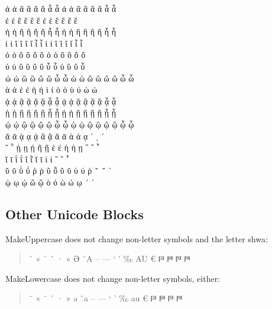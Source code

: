 \documentclass[a4paper]{scrartcl}
\begin{document}
\MakeLowercase{ ἀ ἁ ἂ ἃ ἄ ἅ ἆ ἇ Ἀ Ἁ Ἂ Ἃ Ἄ Ἅ Ἆ Ἇ }\\
\MakeLowercase{ ἐ ἑ ἒ ἓ ἔ ἕ     Ἐ Ἑ Ἒ Ἓ Ἔ Ἕ     }\\
\MakeLowercase{ ἠ ἡ ἢ ἣ ἤ ἥ ἦ ἧ Ἠ Ἡ Ἢ Ἣ Ἤ Ἥ Ἦ Ἧ }\\
\MakeLowercase{ ἰ ἱ ἲ ἳ ἴ ἵ ἶ ἷ Ἰ Ἱ Ἲ Ἳ Ἴ Ἵ Ἶ Ἷ }\\
\MakeLowercase{ ὀ ὁ ὂ ὃ ὄ ὅ     Ὀ Ὁ Ὂ Ὃ Ὄ Ὅ     }\\
\MakeLowercase{ ὐ ὑ ὒ ὓ ὔ ὕ ὖ ὗ   Ὑ   Ὓ   Ὕ   Ὗ }\\
\MakeLowercase{ ὠ ὡ ὢ ὣ ὤ ὥ ὦ ὧ Ὠ Ὡ Ὢ Ὣ Ὤ Ὥ Ὦ Ὧ }\\
\MakeLowercase{ ὰ ά ὲ έ ὴ ή ὶ ί ὸ ό ὺ ύ ὼ ώ     }\\
\MakeLowercase{ ᾀ ᾁ ᾂ ᾃ ᾄ ᾅ ᾆ ᾇ ᾈ ᾉ ᾊ ᾋ ᾌ ᾍ ᾎ ᾏ }\\
\MakeLowercase{ ᾐ ᾑ ᾒ ᾓ ᾔ ᾕ ᾖ ᾗ ᾘ ᾙ ᾚ ᾛ ᾜ ᾝ ᾞ ᾟ }\\
\MakeLowercase{ ᾠ ᾡ ᾢ ᾣ ᾤ ᾥ ᾦ ᾧ ᾨ ᾩ ᾪ ᾫ ᾬ ᾭ ᾮ ᾯ }\\
\MakeLowercase{ ᾰ ᾱ ᾲ ᾳ ᾴ   ᾶ ᾷ Ᾰ Ᾱ Ὰ Ά ᾼ ᾽ ι ᾿ }\\
\MakeLowercase{ ῀ ῁ ῂ ῃ ῄ   ῆ ῇ Ὲ Έ Ὴ Ή ῌ ῍ ῎ ῏ }\\
\MakeLowercase{ ῐ ῑ ῒ ΐ     ῖ ῗ Ῐ Ῑ Ὶ Ί   ῝ ῞ ῟ }\\
\MakeLowercase{ ῠ ῡ ῢ ΰ ῤ ῥ ῦ ῧ Ῠ Ῡ Ὺ Ύ Ῥ ῭ ΅ ` }\\
\MakeLowercase{     ῲ ῳ ῴ   ῶ ῷ Ὸ Ό Ὼ Ώ ῼ ´ ῾   }

\subsection{Other Unicode Blocks}

MakeUppercase does not change non-letter symbols and the letter shwa:
\begin{quote}
  \greekscript
  \MakeUppercase{¨ « ¯ ´ · »}
  \MakeUppercase{ə}
  \MakeUppercase{˘a}
  \MakeUppercase{– — ‘ ’ ‰ a‌u}
  \MakeUppercase{€}
  \MakeUppercase{
  𐅄 %
  𐅅 %
  𐅆 %
  𐅇 %
  }
\end{quote}
MakeLowercase does not change non-letter symbols, either:
\begin{quote}
  \greekscript
  \MakeLowercase{¨ « ¯ ´ · »}
  \MakeLowercase{ə}
  \MakeLowercase{˘A}
  \MakeLowercase{– — ‘ ’ ‰ A‌‌U}
  \MakeLowercase{€}
  \MakeLowercase{
  𐅄 %
  𐅅 %
  𐅆 %
  𐅇 %
  }
\end{quote}
\end{document}
